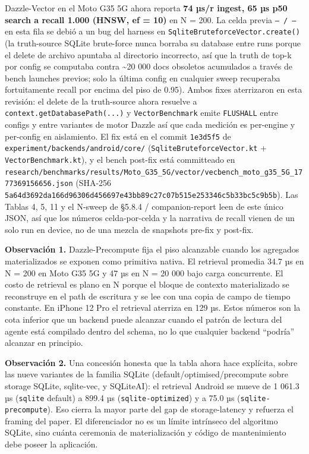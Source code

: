 Dazzle-Vector en el Moto G35 5G ahora reporta \textbf{74 µs/r ingest, 65 µs p50
search a recall 1.000 (HNSW, ef = 10)} en N = 200. La celda previa
\texttt{—\ /\ —} en esta fila se debió a un bug del harness en
\texttt{SqliteBruteforceVector.create()} (la truth-source SQLite brute-force
nunca borraba su database entre runs porque el delete de archivo apuntaba al
directorio incorrecto, así que la truth de top-k por config se computaba contra
\textasciitilde20 000 docs obsoletos acumulados a través de bench launches
previos; solo la última config en cualquier sweep recuperaba fortuitamente
recall por encima del piso de 0.95). Ambos fixes aterrizaron en esta revisión:
el delete de la truth-source ahora resuelve a
\texttt{context.getDatabasePath(...)} y \texttt{VectorBenchmark} emite
\texttt{FLUSHALL} entre configs y entre variantes de motor Dazzle así que cada
medición es per-engine y per-config en aislamiento. El fix está en el commit
\texttt{1e3d5f5} de \texttt{experiment/backends/android/core/}
(\texttt{SqliteBruteforceVector.kt} + \texttt{VectorBenchmark.kt}), y el bench
post-fix está committeado en
\texttt{research/benchmarks/results/Moto\_G35\_5G/vector/vecbench\_moto\_g35\_5G\_1777369156656.json}
(SHA-256
\texttt{5a64d3692da166d96306d456697e43bb89c27c07b515e253346c5b33bc5c9b5b}). Las
Tablas 4, 5, 11 y el N-sweep de §5.8.4 / companion-report leen de este único
JSON, así que los números celda-por-celda y la narrativa de recall vienen de un
solo run en device, no de una mezcla de snapshots pre-fix y post-fix.

\textbf{Observación 1.} Dazzle-Precompute fija el piso alcanzable cuando los
agregados materializados se exponen como primitiva nativa. El retrieval promedia
34.7 µs en N = 200 en Moto G35 5G y 47 µs en N = 20 000 bajo carga concurrente.
El costo de retrieval es plano en N porque el bloque de contexto materializado
se reconstruye en el path de escritura y se lee con una copia de campo de tiempo
constante. En iPhone 12 Pro el retrieval aterriza en 129 µs. Estos números son
la cota inferior que un backend puede alcanzar cuando el patrón de lectura del
agente está compilado dentro del schema, no lo que cualquier backend ``podría''
alcanzar en principio.

\textbf{Observación 2.} Una concesión honesta que la tabla ahora hace explícita,
sobre las nueve variantes de la familia SQLite (default/optimised/precompute
sobre storage SQLite, sqlite-vec, y SQLiteAI): el retrieval Android se mueve de
1 061.3 µs (\texttt{sqlite} default) a 899.4 µs (\texttt{sqlite-optimized}) y a
75.0 µs (\texttt{sqlite-precompute}). Eso cierra la mayor parte del gap de
storage-latency y refuerza el framing del paper. El diferenciador no es un
límite intrínseco del algoritmo SQLite, sino cuánta ceremonia de materialización
y código de mantenimiento debe poseer la aplicación.

